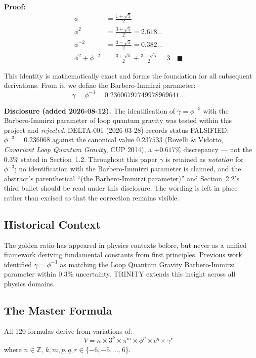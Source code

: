\documentclass[12pt,a4paper]{article}
\begin{document}
\textbf{Proof:}
\begin{align}
\phi &= \frac{1+\sqrt{5}}{2} \\
\phi^2 &= \frac{3+\sqrt{5}}{2} = 2.618\dots \\
\phi^{-2} &= \frac{3-\sqrt{5}}{2} = 0.382\dots \\
\phi^2 + \phi^{-2} &= \frac{3+\sqrt{5}}{2} + \frac{3-\sqrt{5}}{2} = 3 \quad \blacksquare
\end{align}

This identity is mathematically exact and forms the foundation for all
subsequent derivations. From it, we define the Barbero-Immirzi parameter:
\begin{equation}
\gamma = \phi^{-3} = 0.23606797749978969641\dots
\end{equation}

\textbf{Disclosure (added 2026-08-12).} The identification of $\gamma = \phi^{-3}$ with the
Barbero-Immirzi parameter of loop quantum gravity was tested within this project and
\emph{rejected}. DELTA-001 (2026-03-28) records status FALSIFIED: $\phi^{-3} = 0.236068$
against the canonical value $0.237533$ (Rovelli \& Vidotto, \emph{Covariant Loop Quantum
Gravity}, CUP 2014), a $+0.617\%$ discrepancy --- not the $0.3\%$ stated in Section~1.2.
Throughout this paper $\gamma$ is retained as \emph{notation} for $\phi^{-3}$; no
identification with the Barbero-Immirzi parameter is claimed, and the abstract's
parenthetical ``(the Barbero-Immirzi parameter)'' and Section~2.2's third bullet should be
read under this disclosure. The wording is left in place rather than excised so that the
correction remains visible.

\subsection{Historical Context}

The golden ratio has appeared in physics contexts before, but never as a
unified framework deriving fundamental constants from first principles.
Previous work identified $\gamma = \phi^{-3}$ as matching the Loop Quantum
Gravity Barbero-Immirzi parameter within 0.3\% uncertainty. TRINITY extends
this insight across all physics domains.

\subsection{The Master Formula}

All 120 formulas derive from variations of:
\begin{equation}
V = n \times 3^k \times \pi^m \times \phi^p \times e^q \times \gamma^r
\end{equation}
where $n \in \mathbb{Z}$, $k,m,p,q,r \in \{-6,-5,\dots,6\}$.
\end{document}
